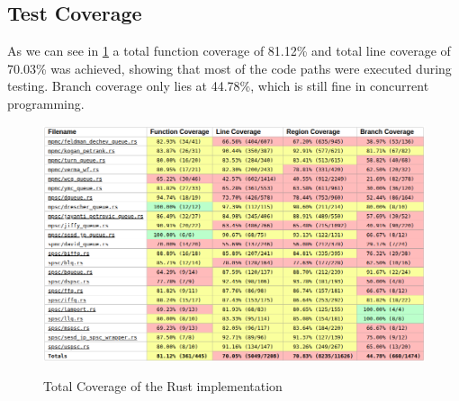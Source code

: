 \subsection{Test Coverage}
As we can see in \cref{fig:cov} a total function coverage of 81.12\% and total line coverage of 70.03\% was achieved, showing that most of the code paths were executed during testing. Branch coverage only lies at 44.78\%, which is still fine in concurrent programming.
\begin{figure}[!ht]
    \centering
    \captionsetup{justification=centering}
    \caption{Total Coverage of the Rust implementation}
    \includegraphics[width=145mm]{images/coverage.png}
    \label{fig:cov}
\end{figure}